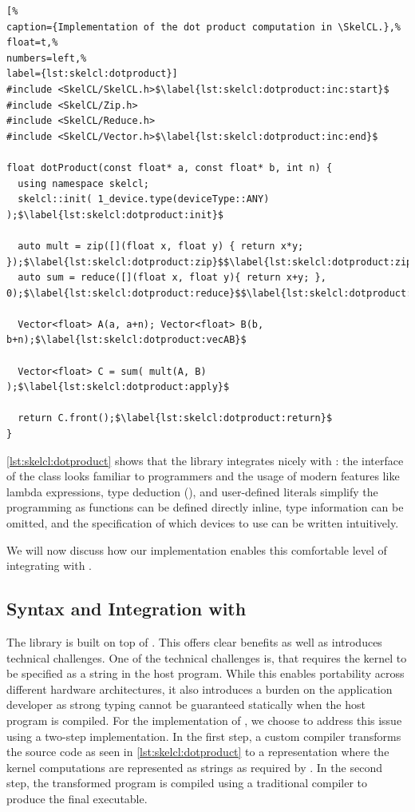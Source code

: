 \begin{lstlisting}[%
caption={Implementation of the dot product computation in \SkelCL.},%
float=t,%
numbers=left,%
label={lst:skelcl:dotproduct}]
#include <SkelCL/SkelCL.h>$\label{lst:skelcl:dotproduct:inc:start}$
#include <SkelCL/Zip.h>
#include <SkelCL/Reduce.h>
#include <SkelCL/Vector.h>$\label{lst:skelcl:dotproduct:inc:end}$

float dotProduct(const float* a, const float* b, int n) {
  using namespace skelcl;
  skelcl::init( 1_device.type(deviceType::ANY) );$\label{lst:skelcl:dotproduct:init}$

  auto mult = zip([](float x, float y) { return x*y; });$\label{lst:skelcl:dotproduct:zip}$$\label{lst:skelcl:dotproduct:zip:lambda}$
  auto sum = reduce([](float x, float y){ return x+y; }, 0);$\label{lst:skelcl:dotproduct:reduce}$$\label{lst:skelcl:dotproduct:reduce:lambda}$

  Vector<float> A(a, a+n); Vector<float> B(b, b+n);$\label{lst:skelcl:dotproduct:vecAB}$

  Vector<float> C = sum( mult(A, B) );$\label{lst:skelcl:dotproduct:apply}$

  return C.front();$\label{lst:skelcl:dotproduct:return}$
}
\end{lstlisting}

\autoref{lst:skelcl:dotproduct} shows that the \SkelCL library integrates nicely with \Cpp:
the interface of the  class looks familiar to \Cpp programmers and the usage of modern \Cpp features like lambda expressions, type deduction (), and user-defined literals simplify the programming as functions can be defined directly inline, type information can be omitted, and the specification of which devices to use can be written intuitively.

We will now discuss how our implementation enables this comfortable level of integrating \SkelCL with \Cpp.










\subsection{Syntax and Integration with \Cpp}
\label{section:skelcl-library:syntax}

The \SkelCL library is built on top of \OpenCL.
This offers clear benefits as well as introduces technical challenges.
One of the technical challenges is, that \OpenCL requires the kernel to be specified as a string in the host program.
While this enables portability across different hardware architectures, it also introduces a burden on the application developer as strong typing cannot be guaranteed statically when the host program is compiled.
For the implementation of \SkelCL, we choose to address this issue using a two-step implementation.
In the first step, a custom compiler transforms the source code as seen in \autoref{lst:skelcl:dotproduct} to a representation where the kernel computations are represented as strings as required by \OpenCL.
In the second step, the transformed program is compiled using a traditional \Cpp compiler to produce the final executable.

